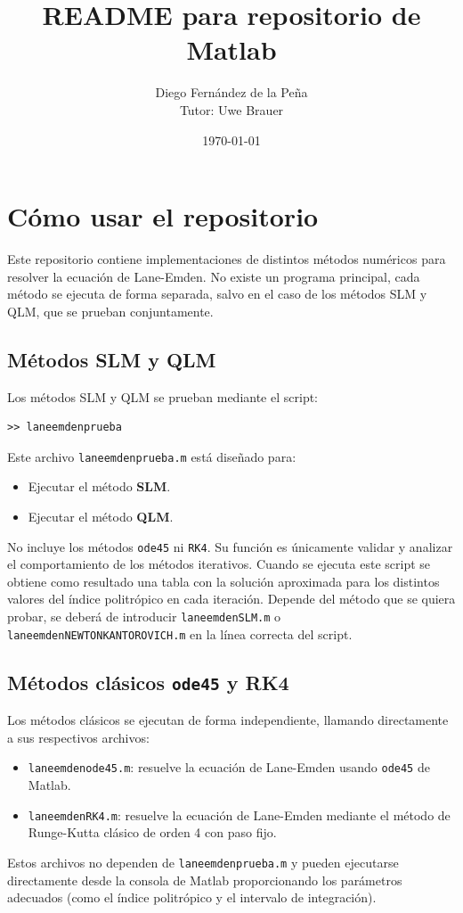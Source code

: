 \documentclass{article}
\title{README para repositorio de Matlab}
\author{Diego Fernández de la Peña \\
Tutor: Uwe Brauer
}
\date{\today}
\begin{document}
\maketitle
\section{Cómo usar el repositorio}

Este repositorio contiene implementaciones de distintos métodos numéricos 
para resolver la ecuación de Lane-Emden. No existe un programa principal, 
cada método se ejecuta de forma separada, salvo en el caso de los métodos 
SLM y QLM, que se prueban conjuntamente.

\subsection{Métodos SLM y QLM}

Los métodos SLM y QLM se prueban mediante el script:
\begin{verbatim}
>> laneemdenprueba
\end{verbatim}
Este archivo \texttt{laneemdenprueba.m} está diseñado para:
\begin{itemize}
  \item Ejecutar el método \textbf{SLM}.
  \item Ejecutar el método \textbf{QLM}.
\end{itemize}
No incluye los métodos \texttt{ode45} ni \texttt{RK4}. 
Su función es únicamente validar y analizar el comportamiento de 
los métodos iterativos. Cuando se ejecuta este script se obtiene 
como resultado una tabla con la solución aproximada para los 
distintos valores del índice politrópico en cada iteración.
Depende del método que se quiera probar, se deberá de introducir
\texttt{laneemdenSLM.m} o \texttt{laneemdenNEWTONKANTOROVICH.m}
en la línea correcta del script.

\subsection{Métodos clásicos \texttt{ode45} y RK4}

Los métodos clásicos se ejecutan de forma independiente, llamando 
directamente a sus respectivos archivos:
\begin{itemize}
  \item \texttt{laneemdenode45.m}: resuelve la ecuación de Lane-Emden usando 
  \texttt{ode45} de Matlab.
  \item \texttt{laneemdenRK4.m}: resuelve la ecuación de Lane-Emden mediante 
  el método de Runge-Kutta clásico de orden 4 con paso fijo.
\end{itemize}
Estos archivos no dependen de \texttt{laneemdenprueba.m} y pueden 
ejecutarse directamente desde la consola de Matlab proporcionando 
los parámetros adecuados (como el índice politrópico y el intervalo 
de integración).
\end{document}
